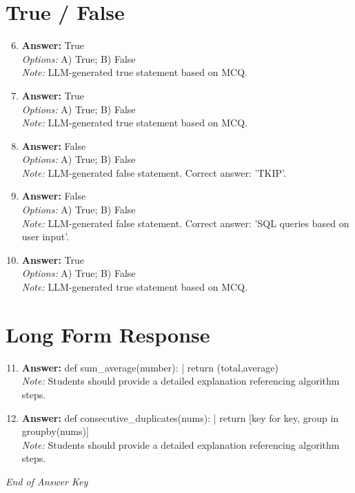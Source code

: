 \documentclass[12pt]{article}
\begin{document}
\section*{True / False}
\begin{enumerate}[label=\arabic*.]
\setcounter{enumi}{5}
\item \textbf{Answer:} True
\\ \textit{Options:} A) True; B) False
\\ \textit{Note:} LLM-generated true statement based on MCQ.
\item \textbf{Answer:} True
\\ \textit{Options:} A) True; B) False
\\ \textit{Note:} LLM-generated true statement based on MCQ.
\item \textbf{Answer:} False
\\ \textit{Options:} A) True; B) False
\\ \textit{Note:} LLM-generated false statement. Correct answer: 'TKIP'.
\item \textbf{Answer:} False
\\ \textit{Options:} A) True; B) False
\\ \textit{Note:} LLM-generated false statement. Correct answer: 'SQL queries based on user input'.
\item \textbf{Answer:} True
\\ \textit{Options:} A) True; B) False
\\ \textit{Note:} LLM-generated true statement based on MCQ.
\end{enumerate}

\section*{Long Form Response}
\begin{enumerate}[label=\arabic*.]
\setcounter{enumi}{10}
\item \textbf{Answer:} def sum\_average(number): | return (total,average)
\\ \textit{Note:} Students should provide a detailed explanation referencing algorithm steps.
\item \textbf{Answer:} def consecutive\_duplicates(nums): | return [key for key, group in groupby(nums)]
\\ \textit{Note:} Students should provide a detailed explanation referencing algorithm steps.
\end{enumerate}

\vfill
\noindent\textit{End of Answer Key}
\end{document}
